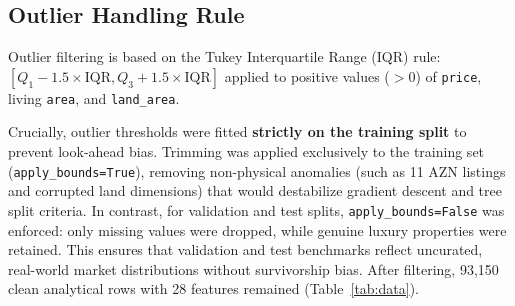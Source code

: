 \documentclass[10pt,twocolumn,a4paper]{article}
\begin{document}
  \subsection{Outlier Handling Rule}
  Outlier filtering is based on the Tukey Interquartile Range (IQR) rule: $[Q_1 - 1.5 \times \text{IQR}, Q_3 + 1.5 \times \text{IQR}]$ applied to positive values ($> 0$) of \texttt{price}, living \texttt{area}, and \texttt{land\_area}.
  
  Crucially, outlier thresholds were fitted \textbf{strictly on the training split} to prevent look-ahead bias. Trimming was applied exclusively to the training set (\texttt{apply\_bounds=True}), removing non-physical anomalies (such as 11 AZN listings and corrupted land dimensions) that would destabilize gradient descent and tree split criteria. In contrast, for validation and test splits, \texttt{apply\_bounds=False} was enforced: only missing values were dropped, while genuine luxury properties were retained. This ensures that validation and test benchmarks reflect uncurated, real-world market distributions without survivorship bias. After filtering, 93,150 clean analytical rows with 28 features remained (Table~\ref{tab:data}).

  \begin{table}[ht]
    \centering
    \caption{Dataset summary and split statistics.}
    \label{tab:data}
  \end{table}
\end{document}
